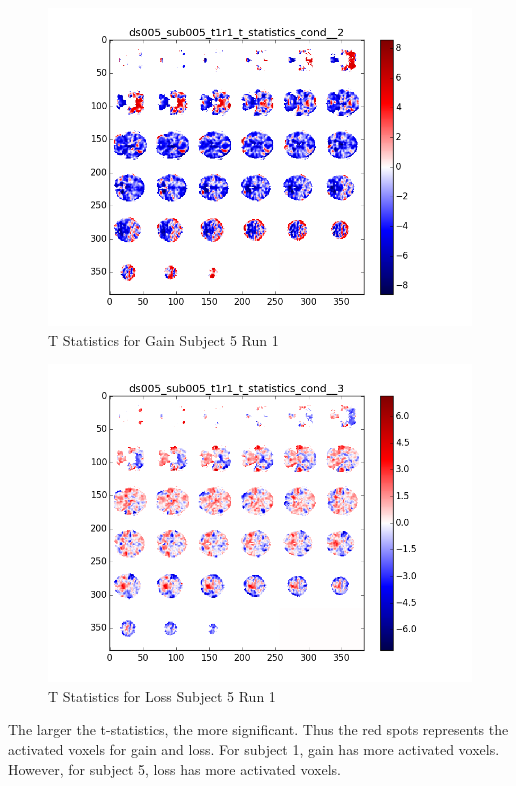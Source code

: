 \begin{figure}[H] 
\centering 
\includegraphics[scale=0.5]{../fig/t_test/ds005_sub005_t1r1_t-test_cond2.png}	 
\caption{T Statistics for Gain Subject 5 Run 1}
\end{figure} 
\begin{figure}[H] 
\centering 
\includegraphics[scale=0.5]{../fig/t_test/ds005_sub005_t1r1_t-test_cond3.png} 
\caption{T Statistics for Loss Subject 5 Run 1}
\end{figure}  
\noindent
The larger the t-statistics, the more significant. Thus the red spots represents the activated voxels for gain and loss. For subject 1, gain has more activated voxels. However, for subject 5, loss has more activated voxels.

